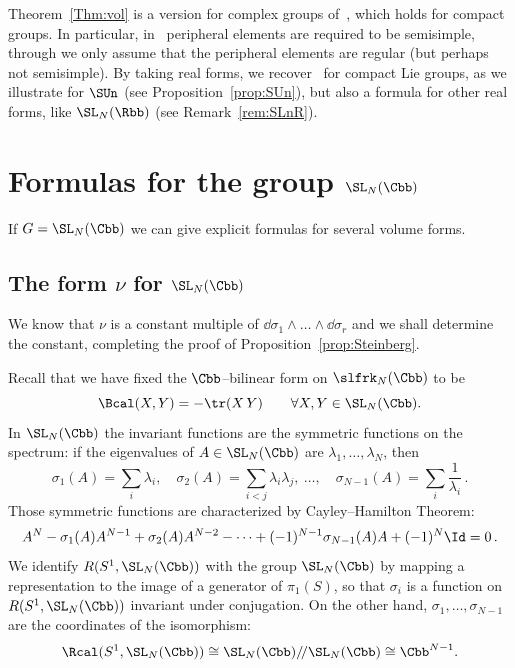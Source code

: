 \begin{rema}\label{rem:BL}
Theorem~\ref{Thm:vol} is a version for complex groups of~\cite[Theorem~5.40]{BL}, which holds for compact groups. In particular, in~\cite[Definition~5.38]{BL} peripheral elements are required to be semisimple, through we only assume that the peripheral elements are regular (but perhaps not semisimple). By taking real forms, we recover~\cite[Theorem~5.40]{BL} for compact Lie groups, as we illustrate for $\SUn$ (see Proposition~\ref{prop:SUn}), but also a formula for other real forms, like $\SL_N(\Rbb)$ (see Remark~\ref{rem:SLnR}).
\end{rema}

\section{Formulas for the group \texorpdfstring{$\SL_N (\Cbb)$}{SLn}}\label{Section:SLn}

If $G=\SL_N (\Cbb)$ we can give explicit formulas for several volume forms.


\subsection{The form \texorpdfstring{$\nu$}{nu} for \texorpdfstring{$\SL_N (\Cbb)$}{SLn}}


We know that $\nu$ is a constant multiple of $\dd\sigma_1\wedge\dots \wedge \dd\sigma_r$ and we shall determine the constant, completing the proof of Proposition~\ref{prop:Steinberg}.

Recall that we have fixed the $\Cbb$--bilinear form on $\slfrk_N (\Cbb)$ to be
\[
\Bcal (X,Y)=-\tr(X\, Y) \qquad \forall X,Y\in\SL_N (\Cbb).
\]
In $\SL_N (\Cbb)$ the invariant functions are the symmetric functions on the spectrum: if the eigenvalues of $A\in\SL_N (\Cbb)$ are $\lambda_1,\dots,\lambda_N$, then
\begin{equation*}
\sigma_1(A) = \sum_i\lambda_i, \quad
\sigma_2(A) = \sum_{i<j}\lambda_i\lambda_j, \ \dots, \quad
\sigma_{N-1}(A) =\sum_i \frac{1}{\lambda_i} \,.
\end{equation*}
Those symmetric functions are characterized by Cayley--Hamilton Theorem:
\[
A^N-\sigma_1(A) A^{N-1}+ \sigma_2(A) A^{N-2}-\dots +(-1)^{N-1}\sigma_{N-1}(A) A+ (-1)^N\Id=0
\,.
\]
We identify $R(S^1,\SL_N (\Cbb))$ with the group $\SL_N (\Cbb)$ by mapping a representation to the image of a generator of $\pi_1(S)$, so that $\sigma_i$ is a function on $R(S^1,\SL_N (\Cbb))$ invariant under conjugation. On the other hand, $\sigma_1,\dots,
\sigma_{N-1}$ are the coordinates of the isomorphism:
\[
\Rcal(S^1, \SL_N (\Cbb))\cong \SL_N (\Cbb)/\! /\SL_N (\Cbb) \cong\Cbb^{N-1}.
\]



